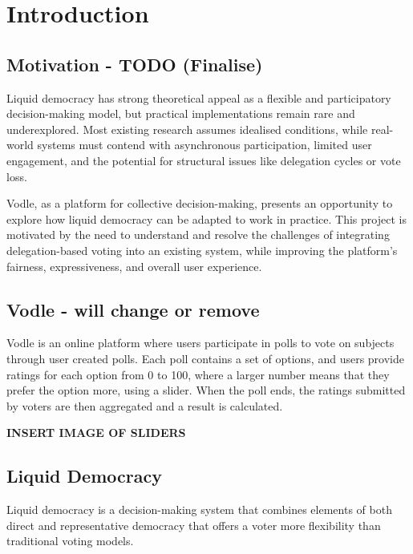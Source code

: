 \chapter{Introduction}
\label{ch:introduction}

\section{Motivation - TODO (Finalise)}
Liquid democracy has strong theoretical appeal as a flexible and participatory decision-making model, but practical implementations remain rare and underexplored. Most existing research assumes idealised conditions, while real-world systems must contend with asynchronous participation, limited user engagement, and the potential for structural issues like delegation cycles or vote loss.

Vodle, as a platform for collective decision-making, presents an opportunity to explore how liquid democracy can be adapted to work in practice. This project is motivated by the need to understand and resolve the challenges of integrating delegation-based voting into an existing system, while improving the platform's fairness, expressiveness, and overall user experience.

\section{Vodle - will change or remove}
Vodle is an online platform where users participate in polls to vote on subjects through user created polls. Each poll contains a set of options, and users provide ratings for each option from 0 to 100, where a larger number means that they prefer the option more, using a slider. When the poll ends, the ratings submitted by voters are then aggregated and a result is calculated.

\textbf{INSERT IMAGE OF SLIDERS}

\section{Liquid Democracy}
Liquid democracy is a decision-making system that combines elements of both direct and representative democracy that offers a voter more flexibility than traditional voting models.

